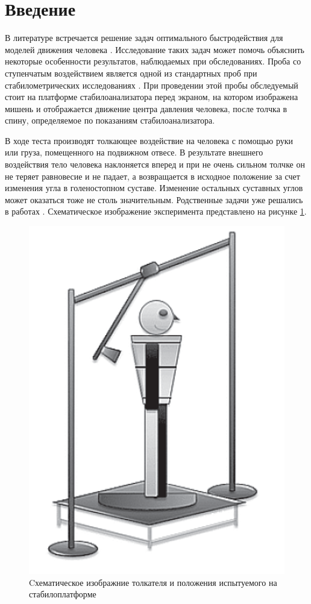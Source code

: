 \documentclass[a4paper,14pt]{article}
\theoremstyle{plain} %
\theoremstyle{definition} %
\theoremstyle{remark} %
\begin{document}
\thispagestyle{empty} %
\normalsize{
\newpage
\tableofcontents
\newpage

\section{Введение}
В литературе встречается решение задач оптимального быстродействия для моделей движения человека \cite{pandy,humanMovements}. Исследование таких задач может помочь объяснить некоторые особенности результатов, наблюдаемых при обследованиях.
Проба со ступенчатым воздействием является одной из стандартных проб
при стабилометрических исследованиях \cite{AdaptFizkult,stabilographTest}. При проведении этой пробы
обследуемый стоит на платформе стабилоанализатора перед экраном, на
котором изображена мишень и отображается движение центра давления
человека, после толчка в спину, определяемое по показаниям стабилоанализатора.

В ходе теста производят толкающее воздействие на человека с помощью руки или
груза, помещенного на подвижном отвесе. В результате внешнего
воздействия тело человека наклоняется вперед и при не очень сильном толчке
он не теряет равновесие и не падает, а возвращается в исходное
положение за счет изменения угла в голеностопном суставе. Изменение
остальных суставных углов может оказаться тоже не столь значительным.
Родственные задачи уже решались в работах \cite{PAKrychinin,kasatkin}.
Схематическое изображение эксперимента представлено на рисунке \ref{fig:pusher}.
\begin{figure}[h!]
    \centering
    \includegraphics[]{human.png}
    \caption{Cхематическое изображние толкателя и
        положения испытуемого на стабилоплатформе}
    \label{fig:pusher}
\end{figure}

}
\end{document}
